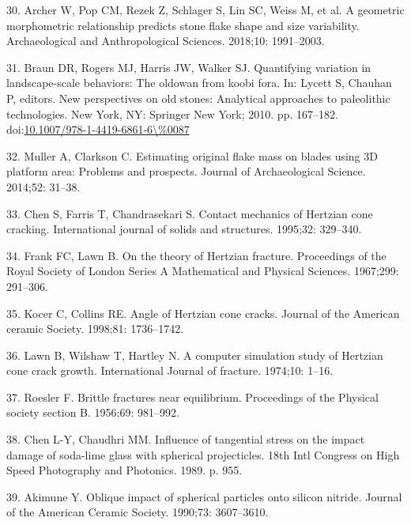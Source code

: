 \documentclass[10pt,letterpaper]{article}
\newenvironment{cslreferences}%
  {}%
  {\par}
\begin{document}
\begin{cslreferences}
\leavevmode\hypertarget{ref-archer_geometric_2018}{}%
30. Archer W, Pop CM, Rezek Z, Schlager S, Lin SC, Weiss M, et al. A
geometric morphometric relationship predicts stone flake shape and size
variability. Archaeological and Anthropological Sciences. 2018;10:
1991--2003.

\leavevmode\hypertarget{ref-Braun2010}{}%
31. Braun DR, Rogers MJ, Harris JW, Walker SJ. Quantifying variation in
landscape-scale behaviors: The oldowan from koobi fora. In: Lycett S,
Chauhan P, editors. New perspectives on old stones: Analytical
approaches to paleolithic technologies. New York, NY: Springer New York;
2010. pp. 167--182.
doi:\href{https://doi.org/10.1007/978-1-4419-6861-6/\%0087}{10.1007/978-1-4419-6861-6\textbackslash\%0087}

\leavevmode\hypertarget{ref-muller_estimating_2014}{}%
32. Muller A, Clarkson C. Estimating original flake mass on blades using
3D platform area: Problems and prospects. Journal of Archaeological
Science. 2014;52: 31--38.

\leavevmode\hypertarget{ref-chen_contact_1995}{}%
33. Chen S, Farris T, Chandrasekari S. Contact mechanics of Hertzian
cone cracking. International journal of solids and structures. 1995;32:
329--340.

\leavevmode\hypertarget{ref-frank_theory_1967}{}%
34. Frank FC, Lawn B. On the theory of Hertzian fracture. Proceedings of
the Royal Society of London Series A Mathematical and Physical Sciences.
1967;299: 291--306.

\leavevmode\hypertarget{ref-kocer_angle_1998}{}%
35. Kocer C, Collins RE. Angle of Hertzian cone cracks. Journal of the
American ceramic Society. 1998;81: 1736--1742.

\leavevmode\hypertarget{ref-lawn_computer_1974}{}%
36. Lawn B, Wilshaw T, Hartley N. A computer simulation study of
Hertzian cone crack growth. International Journal of fracture. 1974;10:
1--16.

\leavevmode\hypertarget{ref-roesler_brittle_1956}{}%
37. Roesler F. Brittle fractures near equilibrium. Proceedings of the
Physical society section B. 1956;69: 981--992.

\leavevmode\hypertarget{ref-chen_influence_1989}{}%
38. Chen L-Y, Chaudhri MM. Influence of tangential stress on the impact
damage of soda-lime glass with spherical projecticles. 18th Intl
Congress on High Speed Photography and Photonics. 1989. p. 955.

\leavevmode\hypertarget{ref-akimune_oblique_1990}{}%
39. Akimune Y. Oblique impact of spherical particles onto silicon
nitride. Journal of the American Ceramic Society. 1990;73: 3607--3610.


\end{cslreferences}
\end{document}
